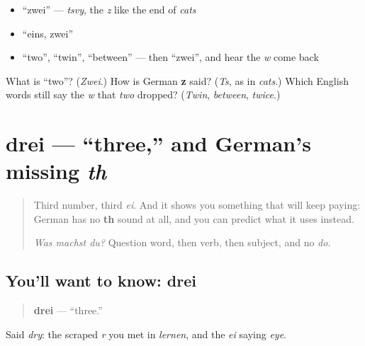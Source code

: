 \begin{itemize}
\raggedright
  \item \textquotedblleft{}zwei\textquotedblright{} — \emph{tsvy}, the \emph{z} like the end of \emph{cats}
  \item \textquotedblleft{}eins, zwei\textquotedblright{}
  \item \textquotedblleft{}two\textquotedblright{}, \textquotedblleft{}twin\textquotedblright{}, \textquotedblleft{}between\textquotedblright{} — then \textquotedblleft{}zwei\textquotedblright{}, and hear the \emph{w} come back
\end{itemize}

\begin{tcolorbox}[breakable,colback=teal!4,colframe=teal!35!black,title={Before you move on}]
What is \textquotedblleft{}two\textquotedblright{}? (\emph{Zwei}.) How is German \textbf{z} said? (\emph{Ts}, as in \emph{cats}.) Which English words still say the \emph{w} that \emph{two} dropped? (\emph{Twin}, \emph{between}, \emph{twice}.)
\end{tcolorbox}
\section[drei]{drei — \textquotedblleft{}three,\textquotedblright{} and German's missing \emph{th}}

\label{lesson:GE-C06-drei}



\begin{quote}
Third number, third \emph{ei}. And it shows you something that will keep paying: German has no \textbf{th} sound at all, and you can predict what it uses instead.

\emph{Was machst du?} Question word, then verb, then subject, and no \emph{do}.
\end{quote}

\subsection*{You'll want to know: drei}
\begin{quote}
\textbf{drei} — \textquotedblleft{}three.\textquotedblright{}
\end{quote}

Said \emph{dry}: the scraped \emph{r} you met in \emph{lernen}, and the \emph{ei} saying \emph{eye}.

